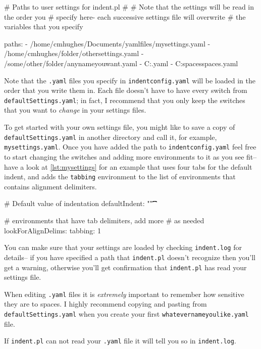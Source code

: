 \begin{yaml}[caption={\lstinline!indentconfig.yaml!},label={lst:indentconfig}]
# Paths to user settings for indent.pl
#
# Note that the settings will be read in the order you 
# specify here- each successive settings file will overwrite
# the variables that you specify

paths:
- /home/cmhughes/Documents/yamlfiles/mysettings.yaml
- /home/cmhughes/folder/othersettings.yaml
- /some/other/folder/anynameyouwant.yaml
- C:\Users\chughes\Documents\mysettings.yaml
- C:\Users\chughes\Desktop\test spaces\more spaces.yaml
\end{yaml}
 	 	 	 	 	
Note that the \lstinline!.yaml! files you specify in \lstinline!indentconfig.yaml!
will be loaded in the order that you write them in. Each file doesn't have 
to have every switch from \lstinline!defaultSettings.yaml!; in fact, I recommend 
that you only keep the switches that you want to \emph{change} in your 
settings files.
 	 	 	 	 	
To get started with your own settings file, you might like to save a copy of 
\lstinline!defaultSettings.yaml! in another directory and call it, for 
example, \lstinline!mysettings.yaml!. Once you have added the path to \lstinline!indentconfig.yaml!
feel free to start changing the switches and adding more environments to it 
as you see fit-- have a look at \cref{lst:mysettings} for an example 
that uses four tabs for the default indent, and adds the \lstinline!tabbing!
environment to the list of environments that contains alignment delimiters.
 	 	 	 	 	
\begin{yaml}[caption={\lstinline!mysettings.yaml! (example)},label={lst:mysettings}]
# Default value of indentation
defaultIndent: "\t\t\t\t"

# environments that have tab delimiters, add more 
# as needed
lookForAlignDelims:
   tabbing: 1
\end{yaml}
 	 	 	 	 	
You can make sure that your settings are loaded by checking \lstinline!indent.log!
for details-- if you have specified a path that \lstinline!indent.pl! doesn't 
recognize then you'll get a warning, otherwise you'll get confirmation that 
\lstinline!indent.pl! has read your settings file.
 	 	 	 	 	
 	 	 	 	 	
\begin{warning}
	When editing \lstinline!.yaml! files it is \emph{extremely} important 
	to remember how sensitive they are to spaces. I highly recommend copying 
	and pasting from \lstinline!defaultSettings.yaml! when you create your
	first \lstinline!whatevernameyoulike.yaml! file.
	
	If \lstinline!indent.pl! can not read your \lstinline!.yaml! file it 
	will tell you so in \lstinline!indent.log!.
\end{warning}
 	 	 	 	 	
